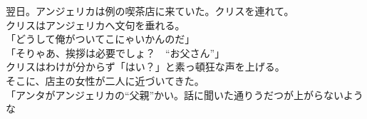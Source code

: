 \documentclass[b5j,10pt,openany]{jsbook}
\begin{document}
翌日。アンジェリカは例の喫茶店に来ていた。クリスを連れて。\\クリスはアンジェリカへ文句を垂れる。\\「どうして俺がついてこにゃいかんのだ」\\「そりゃあ、挨拶は必要でしょ？　``お父さん''」\\クリスはわけが分からず「はい？」と素っ頓狂な声を上げる。\\そこに、店主の女性が二人に近づいてきた。\\「アンタがアンジェリカの``父親''かい。話に聞いた通りうだつが上がらないような
\end{document}
